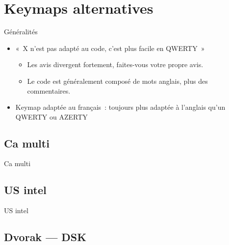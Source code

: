 \section{Keymaps alternatives}


\begin{frame}{Généralités}
    \begin{itemize}
        \item «~X n’est pas adapté au code, c’est plus facile en QWERTY~» \pause
            \begin{itemize}
                \item Les avis divergent fortement, faites-vous votre propre
                  avis. \pause

                \item Le code est généralement composé de mots anglais, plus
                  des commentaires.
            \end{itemize}
            \pause

        \item Keymap adaptée au français~: toujours plus adaptée à
          l’anglais qu’un QWERTY ou AZERTY
    \end{itemize}
\end{frame}



\subsection{Ca multi}

\begin{frame}{Ca multi}
\end{frame}



\subsection{US intel}

\begin{frame}{US intel}
\end{frame}



\subsection{Dvorak — DSK}

